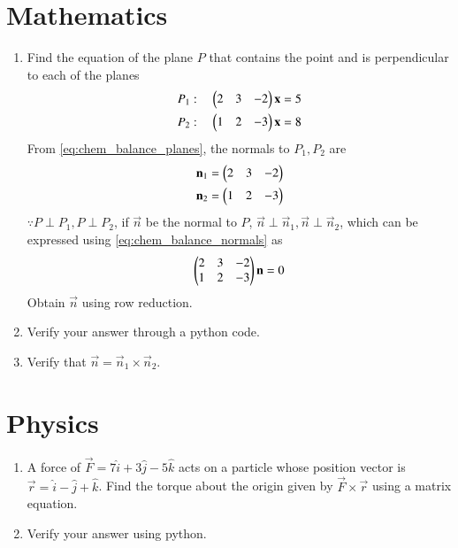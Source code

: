 \documentclass[journal,12pt,twocolumn]{IEEEtran}
\renewcommand\thesection{\arabic{section}}
\begin{document}
\section{Mathematics}
\begin{enumerate}[label=\arabic*.,ref=\thesection.\theenumi]
\item Find the equation of the plane $P$ that contains the point  and is perpendicular to each of the planes
%
\begin{align}
\label{eq:chem_balance_planes}
P_1: \quad \myvec{2 & 3 & -2}\vec{x} &= 5
\\
P_2: \quad \myvec{1 & 2 & -3}\vec{x} &= 8
\end{align}
%
From \eqref{eq:chem_balance_planes}, the normals to $P_1, P_2$ are 
%
\begin{align}
\label{eq:chem_balance_normals}
\begin{split}
\vec{n}_1 = \myvec{2 & 3 & -2}
\\
\vec{n}_2 =  \myvec{1 & 2 & -3}
\end{split}
\end{align}
%
$\because P\perp P_1, P \perp P_2$,  if  $\vec{n}$ be the normal to $P$, $\vec{n}\perp \vec{n}_1, \vec{n}\perp \vec{n}_2 $, which can be expressed using \eqref{eq:chem_balance_normals} as
%
\begin{align}
\label{eq:chem_balance_normals_mat_eq}
 \myvec
{2 & 3 & -2
\\
1 & 2 & -3
}
\vec{n} = 0 
\end{align}
%
Obtain $\vec{n}$ using row reduction.
\item Verify your answer through a python code.
\item Verify that $\vec{n} = \vec{n}_1 \times \vec{n}_2$.
\end{enumerate}
\section{Physics}
\begin{enumerate}[label=\arabic*.,ref=\thesection.\theenumi]
\item A force of $\vec{F} = 7\hat{i}+3\hat{j}-5\hat{k}$ acts on a particle whose position vector is $\vec{r} = \hat{i}-\hat{j}+\hat{k}$.  Find the torque about the origin  given by $\vec{F}\times \vec{r}$ using a matrix equation.
\item Verify your answer using python.
\end{enumerate}
\end{document}
